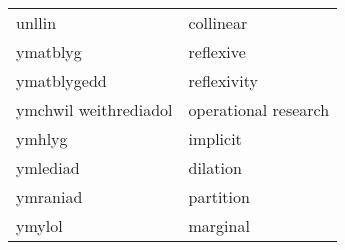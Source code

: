 \begin{supertabular}{p{0.22\textwidth}p{0.22\textwidth}}
                         unllin &                        collinear \\
                       ymatblyg &                        reflexive \\
                    ymatblygedd &                      reflexivity \\
          ymchwil weithrediadol &             operational research \\
                         ymhlyg &                         implicit \\
                       ymlediad &                         dilation \\
                       ymraniad &                        partition \\
                         ymylol &                         marginal \\
\end{supertabular}
